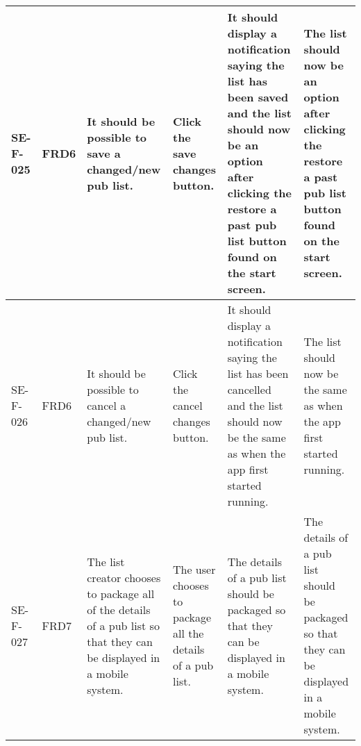 \documentclass{project}
\begin{document}
\begin{center}
\begin{longtable}[c]{| p{1.6cm} | p{1cm} | p{3.5cm} |p{3.3cm} | p{3.3cm} | p{3.0cm} |}
 \hline
 SE-F-025 &FRD6 &It should be possible to save a changed/new pub list. &Click the save changes button. & It should display a notification saying the list has been saved and the list should now be an option after clicking the restore a past pub list button found on the start screen.&The list should now be an option after clicking the restore a past pub list button found on the start screen. \\
 \hline
 SE-F-026& FRD6&It should be possible to cancel a changed/new pub list. &Click the cancel changes button. &It should display a notification saying the list has been cancelled and the list should now be the same as when the app first started running. &The list should now be the same as when the app first started running. \\
 \hline
 SE-F-027 &FRD7 &The list creator chooses to package all of the details of a pub list so that they can be displayed in a mobile system. &The user chooses to package all the details of a pub list. &The details of a pub list should be packaged so that they can be displayed in a mobile system. &The details of a pub list should be packaged so that they can be displayed in a mobile system. \\
  \end{longtable}
 \end{center}
 \clearpage
 
\end{document}
